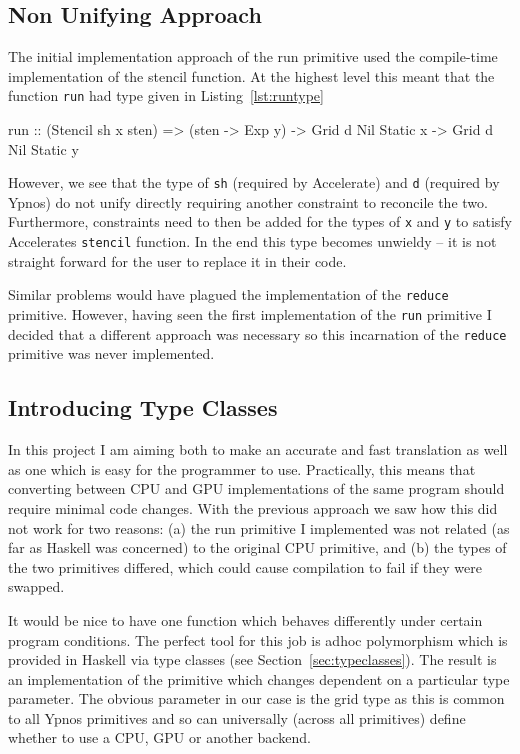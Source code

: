 \documentclass[12pt,a4paper,twoside]{scrbook}
\begin{document}
\subsection{Non Unifying Approach}

The initial implementation approach of the run primitive used the compile-time
implementation of the stencil function. At the highest level this meant that the
function \texttt{run} had type given in Listing~\ref{lst:runtype}

\begin{hflisting}[label={lst:runtype}, caption=The type of run required by Accelerate.]
run :: (Stencil sh x sten) =>
       (sten -> Exp y) -> Grid d Nil Static x -> Grid d Nil Static y
\end{hflisting}

However, we see that the type of \texttt{sh} (required by Accelerate) and
\texttt{d} (required by Ypnos) do not unify directly requiring another
constraint to reconcile the two. Furthermore, constraints need to then be added
for the types of \texttt{x} and \texttt{y} to satisfy Accelerates
\texttt{stencil} function. In the end this type becomes unwieldy -- it is not
straight forward for the user to replace it in their code.

Similar problems would have plagued the implementation of the \texttt{reduce}
primitive. However, having seen the first implementation of the \texttt{run}
primitive I decided that a different approach was necessary so this incarnation
of the \texttt{reduce} primitive was never implemented.

\subsection{Introducing Type Classes}

In this project I am aiming both to make an accurate and fast translation as
well as one which is easy for the programmer to use.  Practically, this means
that converting between CPU and GPU implementations of the same program should
require minimal code changes.  With the previous approach we saw how this did
not work for two reasons: (a) the run primitive I implemented was not related
(as far as Haskell was concerned) to the original CPU primitive, and (b) the
types of the two primitives differed, which could cause compilation to fail if
they were swapped.

It would be nice to have one function which behaves differently under certain
program conditions. The perfect tool for this job is adhoc polymorphism which is
provided in Haskell via type classes (see Section~\ref{sec:typeclasses}). The result is an implementation of the
primitive which changes dependent on a particular type parameter. The obvious
parameter in our case is the grid type as this is common to all Ypnos primitives
and so can universally (across all primitives) define whether to use a CPU, GPU
or another backend.
\end{document}
